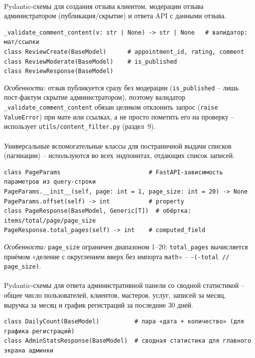 \paragraph{}
Pydantic-схемы для создания отзыва клиентом, модерации отзыва
администратором (публикация/скрытие) и ответа API с данными отзыва.
\begin{verbatim}
_validate_comment_content(v: str | None) -> str | None   # валидатор: мат/ссылки
class ReviewCreate(BaseModel)      # appointment_id, rating, comment
class ReviewModerate(BaseModel)    # is_published
class ReviewResponse(BaseModel)
\end{verbatim}
\textit{Особенности:} отзыв публикуется сразу без модерации
(\texttt{is_published} -- лишь пост-фактум скрытие администратором),
поэтому валидатор \texttt{_validate_comment_content} обязан целиком
отклонить запрос (\texttt{raise ValueError}) при мате или ссылках, а не
просто пометить его на проверку -- использует
\texttt{utils/content_filter.py} (раздел~9).

\paragraph{}
Универсальные вспомогательные классы для постраничной выдачи списков
(пагинации) -- используются во всех эндпоинтах, отдающих список записей.
\begin{verbatim}
class PageParams                         # FastAPI-зависимость параметров из query-строки
PageParams.__init__(self, page: int = 1, page_size: int = 20) -> None
PageParams.offset(self) -> int           # property
class PageResponse(BaseModel, Generic[T])  # обёртка: items/total/page/page_size
PageResponse.total_pages(self) -> int    # computed_field
\end{verbatim}
\textit{Особенности:} \texttt{page_size} ограничен диапазоном 1--20;
\texttt{total_pages} вычисляется приёмом «деление с округлением вверх
без импорта \texttt{math}» -- \texttt{-(-total // page_size)}.

\paragraph{}
Pydantic-схемы для ответа административной панели со сводной
статистикой -- общее число пользователей, клиентов, мастеров, услуг,
записей за месяц, выручка за месяц и график регистраций за последние 30
дней.
\begin{verbatim}
class DailyCount(BaseModel)          # пара «дата + количество» (для графика регистраций)
class AdminStatsResponse(BaseModel)  # сводная статистика для главного экрана админки
\end{verbatim}


